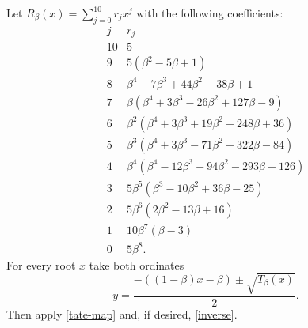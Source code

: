 \documentclass[11pt]{article}
\begin{document}
Let $R_\beta(x)=\sum_{j=0}^{10}r_jx^j$ with the following coefficients:
\begin{equation}\label{residual-table}
\begin{array}{c|l}
j&r_j\\\hline
10&5\\
9&5(\beta^2-5\beta+1)\\
8&\beta^4-7\beta^3+44\beta^2-38\beta+1\\
7&\beta(\beta^4+3\beta^3-26\beta^2+127\beta-9)\\
6&\beta^2(\beta^4+3\beta^3+19\beta^2-248\beta+36)\\
5&\beta^3(\beta^4+3\beta^3-71\beta^2+322\beta-84)\\
4&\beta^4(\beta^4-12\beta^3+94\beta^2-293\beta+126)\\
3&5\beta^5(\beta^3-10\beta^2+36\beta-25)\\
2&5\beta^6(2\beta^2-13\beta+16)\\
1&10\beta^7(\beta-3)\\
0&5\beta^8.
\end{array}
\end{equation}
For every root $x$ take both ordinates
\begin{equation}\label{ordinates}
y=\frac{-((1-\beta)x-\beta)\pm\sqrt{T_\beta(x)}}2.
\end{equation}
Then apply \eqref{tate-map} and, if desired, \eqref{inverse}.
\end{document}
